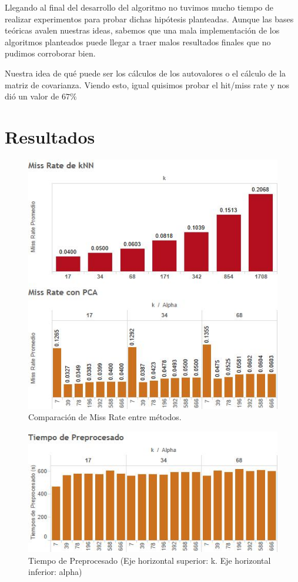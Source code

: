 \documentclass{article}
\begin{document}
  
  Llegando al final del desarrollo del algoritmo no tuvimos mucho tiempo de realizar experimentos para probar dichas hipótesis planteadas. Aunque las bases teóricas avalen nuestras ideas, sabemos que una mala implementación de los algoritmos planteados puede llegar a traer malos resultados finales que no pudimos corroborar bien.
  
  Nuestra idea de qué puede ser los cálculos de los autovalores o el cálculo de la matriz de covarianza. Viendo esto, igual quisimos probar el hit/miss rate y nos dió un valor de $67\%$
 

\section*{Resultados}{}
\begin{figure}[H]
\centering
\includegraphics[scale=0.90]{MissRates.jpg}
\caption{Comparación de Miss Rate entre métodos.}
\end{figure}

\begin{figure}[H]
\centering
\includegraphics[scale=0.90]{preprocesado.jpg}
\caption{Tiempo de Preprocesado (Eje horizontal superior: k. Eje horizontal inferior: alpha)}
\end{figure}
\end{document}

